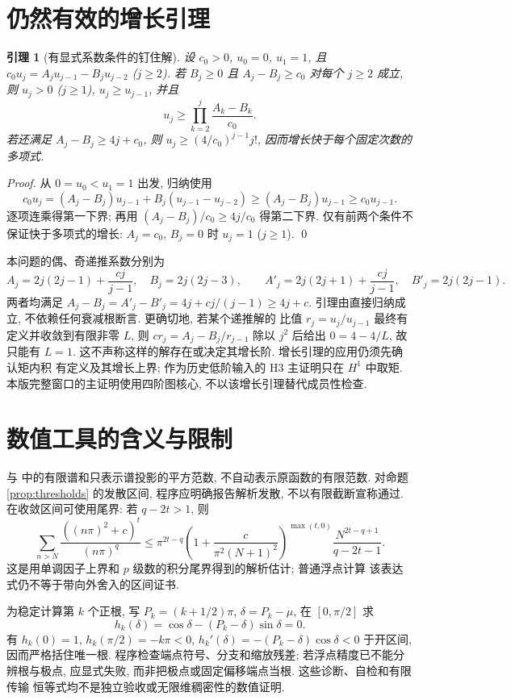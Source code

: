 \documentclass[UTF8]{ctexart}
\newtheorem{lemma}[theorem]{引理}
\begin{document}
\section{仍然有效的增长引理}
\begin{lemma}[有显式系数条件的钉住解]\label{lem:growth}
设 $c_0>0$, $u_0=0$, $u_1=1$, 且
$c_0u_j=A_ju_{j-1}-B_ju_{j-2}$ ($j\ge2$).
若 $B_j\ge0$ 且 $A_j-B_j\ge c_0$ 对每个 $j\ge2$ 成立, 则
$u_j>0$ ($j\ge1$), $u_j\ge u_{j-1}$, 并且
\[
 u_j\ge\prod_{k=2}^j\frac{A_k-B_k}{c_0}.
\]
若还满足 $A_j-B_j\ge4j+c_0$, 则
$u_j\ge(4/c_0)^{j-1}j!$, 因而增长快于每个固定次数的多项式.
\end{lemma}
\begin{proof}
从 $0=u_0<u_1=1$ 出发, 归纳使用
\[
 c_0u_j=(A_j-B_j)u_{j-1}+B_j(u_{j-1}-u_{j-2})
 \ge(A_j-B_j)u_{j-1}\ge c_0u_{j-1}.
\]
逐项连乘得第一下界; 再用 $(A_j-B_j)/c_0\ge4j/c_0$ 得第二下界.
仅有前两个条件不保证快于多项式的增长: $A_j=c_0$, $B_j=0$ 时
$u_j=1$ ($j\ge1$). \qed
\end{proof}

本问题的偶、奇递推系数分别为
\[
 A_j=2j(2j-1)+\frac{cj}{j-1},\quad B_j=2j(2j-3),\qquad
 A'_j=2j(2j+1)+\frac{cj}{j-1},\quad B'_j=2j(2j-1).
\]
两者均满足 $A_j-B_j=A'_j-B'_j=4j+cj/(j-1)\ge4j+c$.
引理由直接归纳成立, 不依赖任何衰减根断言. 更确切地, 若某个递推解的
比值 $r_j=u_j/u_{j-1}$ 最终有定义并收敛到有限非零 $L$, 则
$cr_j=A_j-B_j/r_{j-1}$ 除以 $j^2$ 后给出 $0=4-4/L$, 故只能有 $L=1$.
这不声称这样的解存在或决定其增长阶. 增长引理的应用仍须先确认矩内积
有定义及其增长上界; 作为历史低阶输入的 H3 主证明只在 $H^1$ 中取矩.
本版完整窗口的主证明使用四阶图核心, 不以该增长引理替代成员性检查.

\section{数值工具的含义与限制}
 与
 中的有限谱和只表示谱投影的平方范数,
不自动表示原函数的有限范数. 对命题 \ref{prop:thresholds} 的发散区间,
程序应明确报告解析发散, 不以有限截断宣称通过. 在收敛区间可使用尾界:
若 $q-2t>1$, 则
\[
 \sum_{n>N}\frac{((n\pi)^2+c)^t}{(n\pi)^q}
 \le \pi^{2t-q}\left(1+\frac{c}{\pi^2(N+1)^2}\right)^{\max(t,0)}
 \frac{N^{2t-q+1}}{q-2t-1}.
\]
这是用单调因子上界和 $p$ 级数的积分尾界得到的解析估计; 普通浮点计算
该表达式仍不等于带向外舍入的区间证书.

为稳定计算第 $k$ 个正根, 写 $P_k=(k+1/2)\pi$, $\delta=P_k-\mu$,
在 $[0,\pi/2]$ 求
\[
 h_k(\delta)=\cos\delta-(P_k-\delta)\sin\delta=0.
\]
有 $h_k(0)=1$, $h_k(\pi/2)=-k\pi<0$,
$h_k'(\delta)=-(P_k-\delta)\cos\delta<0$ 于开区间, 因而严格括住唯一根.
程序检查端点符号、分支和缩放残差; 若浮点精度已不能分辨根与极点,
应显式失败, 而非把极点或固定偏移端点当根. 这些诊断、自检和有限传输
恒等式均不是独立验收或无限维稠密性的数值证明.
\end{document}
